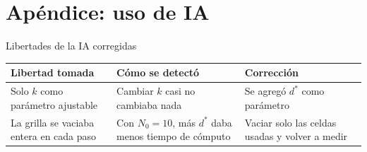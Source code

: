 \documentclass[aspectratio=169,20pt]{beamer}
\newif\ifapoyo\apoyofalse
\newif\ifincluirapoyo\incluirapoyotrue
\begin{document}
\section{Apéndice: uso de IA}
\begin{frame}{Libertades de la IA corregidas}
\renewcommand{\arraystretch}{1.4}
\fontsize{17}{21}\selectfont
\begin{tabular}{p{}p{}p{}}\toprule
\textbf{Libertad tomada} & \textbf{Cómo se detectó} & \textbf{Corrección}\\\midrule
Solo $k$ como parámetro ajustable &
Cambiar $k$ casi no cambiaba nada &
Se agregó $d^*$ como parámetro\\[2mm]
La grilla se vaciaba entera en cada paso &
Con $N_0=10$, más $d^*$ daba menos tiempo de cómputo &
Vaciar solo las celdas usadas y volver a medir\\\bottomrule
\end{tabular}
\label{finprincipal}
\end{frame}

\ifincluirapoyo
\apoyotrue
\fi
\end{document}
